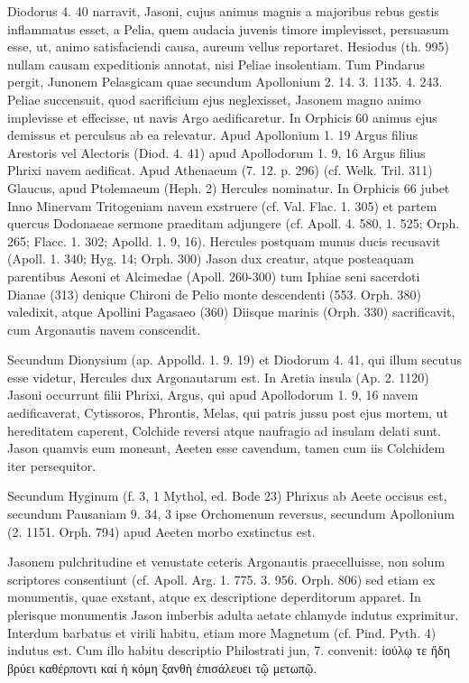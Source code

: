 \documentclass[landscape, a4paper, 11pt, oneside, polutonikogreek, german]{article}
\begin{document}
Diodorus 4. 40 narravit, Jasoni, cujus animus magnis a majoribus rebus gestis inflammatus esset, a Pelia, quem audacia juvenis timore implevisset, persuasum esse, ut, animo satisfaciendi causa, aureum vellus reportaret. Hesiodus (th. 995) nullam causam expeditionis annotat, nisi Peliae insolentiam. Tum Pindarus pergit, Junonem Pelasgicam quae secundum Apollonium 2. 14. 3. 1135. 4. 243. Peliae succensuit, quod sacrificium ejus neglexisset, Jasonem magno animo implevisse et effecisse, ut navis Argo aedificaretur. In Orphicis 60 animus ejus demissus et perculsus ab ea relevatur. Apud Apollonium 1. 19 Argus filius Arestoris vel Alectoris (Diod. 4. 41) apud Apollodorum 1. 9, 16 Argus filius Phrixi navem aedificat. Apud Athenaeum (7. 12. p. 296) (cf. Welk. Tril. 311) Glaucus, apud Ptolemaeum (Heph. 2) Hercules nominatur. In Orphicis 66 jubet Inno Minervam Tritogeniam navem exstruere (cf. Val. Flac. 1. 305) et partem quercus Dodonaeae sermone praeditam adjungere (cf. Apoll. 4. 580, 1. 525; Orph. 265; Flacc. 1. 302; Apolld. 1. 9, 16). Hercules postquam munus ducis recusavit (Apoll. 1. 340; Hyg. 14; Orph. 300) Jason dux creatur, atque posteaquam parentibus Aesoni et Alcimedae (Apoll. 260-300) tum Iphiae seni sacerdoti Dianae (313) denique Chironi de Pelio monte descendenti (553. Orph. 380) valedixit, atque Apollini Pagasaeo (360) Diisque marinis (Orph. 330) sacrificavit, cum Argonautis navem conscendit.

Secundum Dionysium (ap. Appolld. 1. 9. 19) et Diodorum 4. 41, qui illum secutus esse videtur, Hercules dux Argonautarum est. In Aretia insula (Ap. 2. 1120) Jasoni occurrunt filii Phrixi, Argus, qui apud Apollodorum 1. 9, 16 navem aedificaverat, Cytissoros, Phrontis, Melas, qui patris jussu post ejus mortem, ut hereditatem caperent, Colchide reversi atque naufragio ad insulam delati sunt. Jason quamvis eum moneant, Aeeten esse cavendum, tamen cum iis Colchidem iter persequitor.

Secundum Hyginum (f. 3, 1 Mythol, ed. Bode 23) Phrixus ab Aeete occisus est, secundum Pausaniam 9. 34, 3 ipse Orchomenum reversus, secundum Apollonium (2. 1151. Orph. 794) apud Aeeten morbo exstinctus est.

Jasonem pulchritudine et venustate ceteris Argonautis praecelluisse, non solum scriptores consentiunt (cf. Apoll. Arg. 1. 775. 3. 956. Orph. 806) sed etiam ex monumentis, quae exstant, atque ex descriptione deperditorum apparet. In plerisque monumentis Jason imberbis adulta aetate chlamyde indutus exprimitur. Interdum barbatus et virili habitu, etiam more Magnetum (cf. Pind. Pyth. 4) indutus est. Cum illo habitu descriptio Philostrati jun, 7. convenit: ἰούλῳ τε ἤδη βρύει καθέρποντι καί ἡ κόμη ξανθὴ ἐπισάλευει τῷ μετωπῷ.
\end{document}
